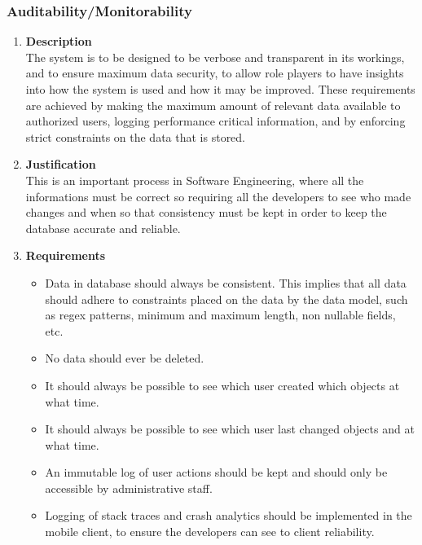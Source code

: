 \documentclass[a4paper,10pt]{article}
\begin{document}
\subsubsection{Auditability/Monitorability}
\begin{enumerate}
\item \textbf{Description} \\
The system is to be designed to be verbose and transparent in its workings, and to ensure maximum data security, to allow role players to have insights into how the system is used and how it may be improved. These requirements are achieved by making the maximum amount of relevant data available to authorized users, logging performance critical information, and by enforcing strict constraints on the data that is stored. 
\item \textbf{Justification} \\
This is an important process in Software Engineering, where all the informations must be correct so requiring all the developers to see who made changes and when so that consistency must be kept in order to keep the database accurate and reliable.
\item \textbf{Requirements}
	\begin{itemize}
		\item Data in database should always be consistent. This implies that all data should adhere to constraints placed on the data by the data model, such as regex patterns, minimum and maximum length, non nullable fields, etc.
		\item No data should ever be deleted.
		\item It should always be possible to see which user created which objects at what time.
		\item It should always be possible to see which user last changed objects and at what time.
		\item An immutable log of user actions should be kept and should only be accessible by administrative staff.
		\item Logging of stack traces and crash analytics should be implemented in the mobile client, to ensure the developers can see to client reliability.
	\end{itemize}
\end{enumerate}
\end{document}
